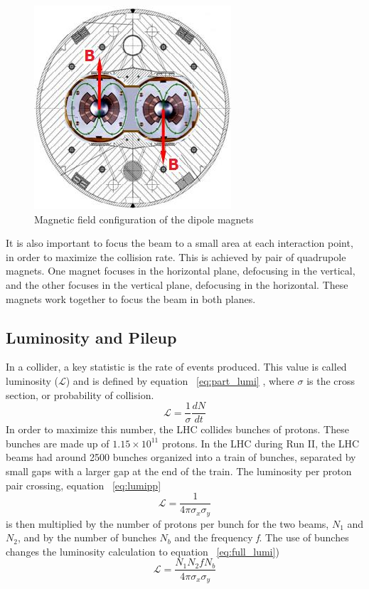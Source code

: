 \begin{figure}[h!]
\begin{center}
\includegraphics[scale=0.9]{figures/dipole_bfield}
\caption[Magnetic field configuration of the dipole magnets]{Magnetic field configuration of the dipole magnets \cite{Lorentz}}
\label{Fig:bfield}
\end{center}
\end{figure}

\indent	It is also important to focus the beam to a small area at each interaction point, in order to maximize the collision rate. This is achieved by 
pair of quadrupole magnets. One magnet focuses in the horizontal plane, defocusing in the vertical, and the other focuses in the vertical plane, defocusing in the horizontal. These magnets work together to focus the beam in both planes. 
\subsection{Luminosity and Pileup}
In a collider, a key statistic is the rate of events produced. This value is called luminosity (${\mathcal{L}}$) and is defined by equation ~\ref{eq:part_lumi} \cite{Aaboud:2016hhf}, where ${\sigma}$ is the cross section, or probability of collision.
\begin{equation}
\label{eq:part_lumi}
\mathcal{L} = \frac{1}{\sigma}\frac{dN}{dt}
\end{equation}
In order to maximize this number, the LHC collides bunches of protons. These bunches are made up of ${1.15\times10^{11}}$ protons. In the LHC during Run II, the LHC beams had around 2500 bunches organized into a train of bunches, separated by small gaps with a larger gap at the end of the train. The luminosity per proton pair crossing, equation ~\ref{eq:lumipp}
\begin{equation}
\label{eq:lumipp}
\mathcal{L} = \frac{1}{4\pi\sigma_{x}\sigma_{y}}
\end{equation}
is then multiplied by the number of protons per bunch for the two beams, ${N_{1}}$ and ${N_{2}}$, and by the number of bunches ${N_{b}}$ and the frequency \textit{f}. The use of bunches changes the luminosity calculation to equation ~\ref{eq:full_lumi})
\newline
\begin{equation}
\label{eq:full_lumi}
\mathcal{L} = \frac{N_{1}N_{2}fN_{b}}{4\pi\sigma_{x}\sigma_{y}}
\end{equation}

